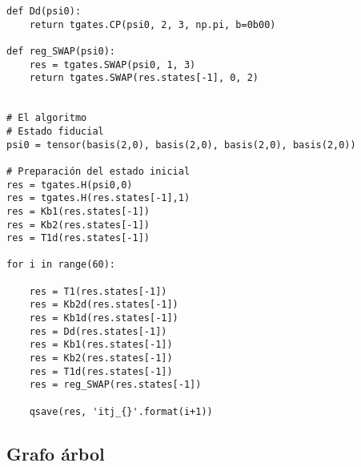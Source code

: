 \begin{verbatim}
def Dd(psi0):
    return tgates.CP(psi0, 2, 3, np.pi, b=0b00)

def reg_SWAP(psi0):
    res = tgates.SWAP(psi0, 1, 3)
    return tgates.SWAP(res.states[-1], 0, 2)


# El algoritmo
# Estado fiducial
psi0 = tensor(basis(2,0), basis(2,0), basis(2,0), basis(2,0))

# Preparación del estado inicial
res = tgates.H(psi0,0)
res = tgates.H(res.states[-1],1)
res = Kb1(res.states[-1])
res = Kb2(res.states[-1])
res = T1d(res.states[-1])

for i in range(60):
    
    res = T1(res.states[-1])
    res = Kb2d(res.states[-1])
    res = Kb1d(res.states[-1])
    res = Dd(res.states[-1])
    res = Kb1(res.states[-1])
    res = Kb2(res.states[-1])
    res = T1d(res.states[-1])
    res = reg_SWAP(res.states[-1])
    
    qsave(res, 'itj_{}'.format(i+1))

\end{verbatim}

\subsection{Grafo árbol}

